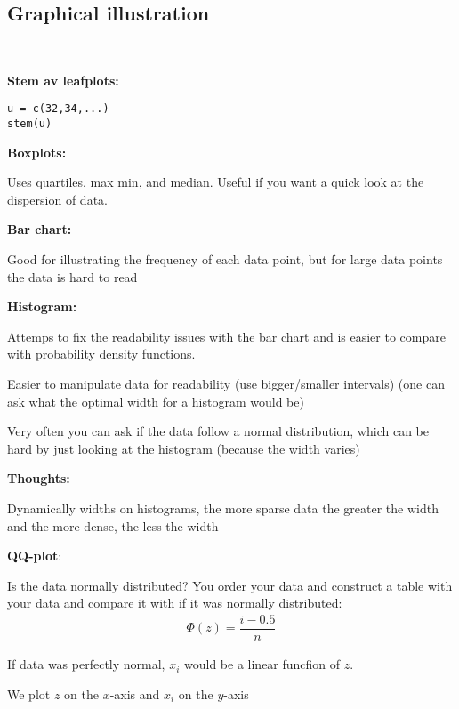 \subsection{Graphical illustration}\hfill\\\par
\noindent\textbf{Stem av leafplots:}
\begin{verbatim}
u = c(32,34,...)
stem(u)
\end{verbatim}
\par\bigskip
\noindent\textbf{Boxplots:}\par
\noindent Uses quartiles, max min, and median. Useful if you want a quick look at the dispersion of data.
\par\bigskip
\noindent\textbf{Bar chart:}\par
\noindent Good for illustrating the frequency of each data point, but for large data points the data is hard to read
\par\bigskip
\noindent\textbf{Histogram:}\par
\noindent Attemps to fix the readability issues with the bar chart and is easier to compare with probability density functions.\par
\noindent Easier to manipulate data for readability (use bigger/smaller intervals) (one can ask what the optimal width for a histogram would be)\par
\noindent Very often you can ask if the data follow a normal distribution, which can be hard by just looking at the histogram (because the width varies) 
\par\bigskip
\noindent\textbf{Thoughts:}\par
\noindent Dynamically widths on histograms, the more sparse data the greater the width and the more dense, the less the width 
\par\bigskip
\noindent\textbf{QQ-plot}:\par
\noindent Is the data normally distributed? You order your data and construct a table with your data and compare it with if it was normally distributed:
\begin{equation*}
  \begin{gathered}
    \Phi(z) = \dfrac{i-0.5}{n}
  \end{gathered}
\end{equation*}
\par\bigskip
\noindent If data was perfectly normal, $x_i$ would be a linear funcfion of $z$.\par
\noindent We plot $z$ on the $x$-axis and $x_i$ on the $y$-axis
\par\bigskip
